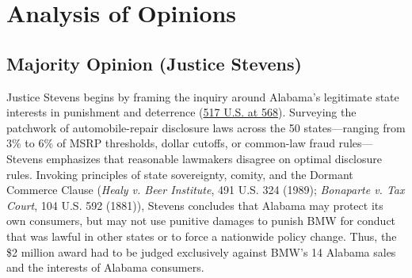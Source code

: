 \documentclass[12pt]{article}
\begin{document}
\section{Analysis of Opinions}

\subsection{Majority Opinion (Justice Stevens)}

Justice Stevens begins by framing the inquiry around Alabama's legitimate state interests in punishment and deterrence (\href{https://supreme.justia.com/cases/federal/us/517/559/}{517 U.S. at 568}). Surveying the patchwork of automobile-repair disclosure laws across the 50 states---ranging from 3\% to 6\% of MSRP thresholds, dollar cutoffs, or common-law fraud rules---Stevens emphasizes that reasonable lawmakers disagree on optimal disclosure rules. Invoking principles of state sovereignty, comity, and the Dormant Commerce Clause (\textit{Healy v. Beer Institute}, 491 U.S. 324 (1989); \textit{Bonaparte v. Tax Court}, 104 U.S. 592 (1881)), Stevens concludes that Alabama may protect its own consumers, but may not use punitive damages to punish BMW for conduct that was lawful in other states or to force a nationwide policy change. Thus, the \$2 million award had to be judged exclusively against BMW's 14 Alabama sales and the interests of Alabama consumers.
\end{document}
